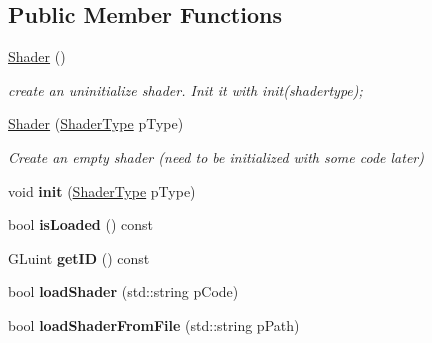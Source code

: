 \subsection*{\-Public \-Member \-Functions}
\begin{DoxyCompactItemize}
\item 
\hypertarget{classde_1_1data_1_1_shader_a00c8bf4cd6b0444bd136abae0eb712c3}{
\hyperlink{classde_1_1data_1_1_shader_a00c8bf4cd6b0444bd136abae0eb712c3}{\-Shader} ()}
\label{classde_1_1data_1_1_shader_a00c8bf4cd6b0444bd136abae0eb712c3}

\begin{DoxyCompactList}\small\item\em create an uninitialize shader. \-Init it with init(shadertype); \end{DoxyCompactList}\item 
\hyperlink{classde_1_1data_1_1_shader_ab0bdd894b1d863e0cef81a1abe5cca79}{\-Shader} (\hyperlink{classde_1_1data_1_1_shader_a51d5bfadf16d2268280b5ffc0ee0ca82}{\-Shader\-Type} p\-Type)
\begin{DoxyCompactList}\small\item\em \-Create an empty shader (need to be initialized with some code later) \end{DoxyCompactList}\item 
\hypertarget{classde_1_1data_1_1_shader_af60195244f00992f5d5a5e87a0997bde}{
void {\bfseries init} (\hyperlink{classde_1_1data_1_1_shader_a51d5bfadf16d2268280b5ffc0ee0ca82}{\-Shader\-Type} p\-Type)}
\label{classde_1_1data_1_1_shader_af60195244f00992f5d5a5e87a0997bde}

\item 
\hypertarget{classde_1_1data_1_1_shader_aaeb01a7ded1439a857ba0fb15f387bb3}{
bool {\bfseries is\-Loaded} () const }
\label{classde_1_1data_1_1_shader_aaeb01a7ded1439a857ba0fb15f387bb3}

\item 
\hypertarget{classde_1_1data_1_1_shader_ada143dca593f3d0f094f6fb873d70229}{
\-G\-Luint {\bfseries get\-I\-D} () const }
\label{classde_1_1data_1_1_shader_ada143dca593f3d0f094f6fb873d70229}

\item 
\hypertarget{classde_1_1data_1_1_shader_ab23e02915a3b10549dc50333147d4065}{
bool {\bfseries load\-Shader} (std\-::string p\-Code)}
\label{classde_1_1data_1_1_shader_ab23e02915a3b10549dc50333147d4065}

\item 
\hypertarget{classde_1_1data_1_1_shader_aca7bf7b50373c95750c53e3c4a5b4985}{
bool {\bfseries load\-Shader\-From\-File} (std\-::string p\-Path)}
\label{classde_1_1data_1_1_shader_aca7bf7b50373c95750c53e3c4a5b4985}


\end{DoxyCompactItemize}
